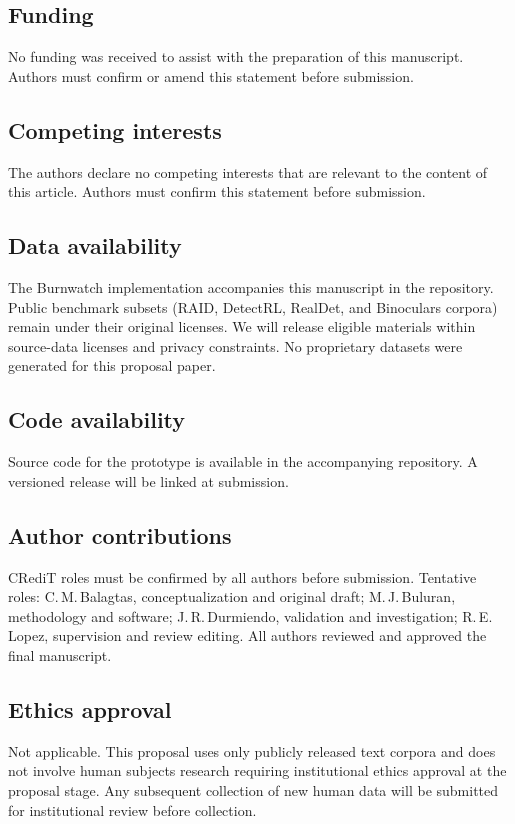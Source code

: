 \documentclass[pdflatex,sn-mathphys-num]{sn-jnl}
\begin{document}
\subsection*{Funding}
No funding was received to assist with the preparation of this manuscript. Authors must confirm or amend this statement before submission.

\subsection*{Competing interests}
The authors declare no competing interests that are relevant to the content of this article. Authors must confirm this statement before submission.

\subsection*{Data availability}
The Burnwatch implementation accompanies this manuscript in the repository. Public benchmark subsets (RAID, DetectRL, RealDet, and Binoculars corpora) remain under their original licenses. We will release eligible materials within source-data licenses and privacy constraints. No proprietary datasets were generated for this proposal paper.

\subsection*{Code availability}
Source code for the prototype is available in the accompanying repository. A versioned release will be linked at submission.

\subsection*{Author contributions}
CRediT roles must be confirmed by all authors before submission. Tentative roles: C.\,M.\,Balagtas, conceptualization and original draft; M.\,J.\,Buluran, methodology and software; J.\,R.\,Durmiendo, validation and investigation; R.\,E.\,Lopez, supervision and review editing. All authors reviewed and approved the final manuscript.

\subsection*{Ethics approval}
Not applicable. This proposal uses only publicly released text corpora and does not involve human subjects research requiring institutional ethics approval at the proposal stage. Any subsequent collection of new human data will be submitted for institutional review before collection.
\end{document}
